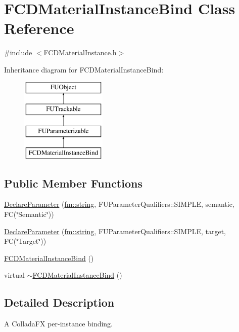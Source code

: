 \hypertarget{classFCDMaterialInstanceBind}{
\section{FCDMaterialInstanceBind Class Reference}
\label{classFCDMaterialInstanceBind}
}


{\ttfamily \#include $<$FCDMaterialInstance.h$>$}

Inheritance diagram for FCDMaterialInstanceBind:\begin{figure}[H]
\begin{center}
\leavevmode
\includegraphics[height=4.000000cm]{classFCDMaterialInstanceBind}
\end{center}
\end{figure}
\subsection*{Public Member Functions}
\begin{DoxyCompactItemize}
\item 
\hyperlink{classFCDMaterialInstanceBind_a2bf41e0faaa069005b83dcaa1905c70d}{DeclareParameter} (\hyperlink{classfm_1_1stringT}{fm::string}, FUParameterQualifiers::SIMPLE, semantic, FC(\char`\"{}Semantic\char`\"{}))
\item 
\hyperlink{classFCDMaterialInstanceBind_afc4292ce656c086072f94c60aab4fe7d}{DeclareParameter} (\hyperlink{classfm_1_1stringT}{fm::string}, FUParameterQualifiers::SIMPLE, target, FC(\char`\"{}Target\char`\"{}))
\item 
\hyperlink{classFCDMaterialInstanceBind_ac7e860a99a6350a85303484622027216}{FCDMaterialInstanceBind} ()
\item 
virtual \hyperlink{classFCDMaterialInstanceBind_a62c40ea4f4a606b215984fbeb25e6263}{$\sim$FCDMaterialInstanceBind} ()
\end{DoxyCompactItemize}


\subsection{Detailed Description}
A ColladaFX per-\/instance binding.

